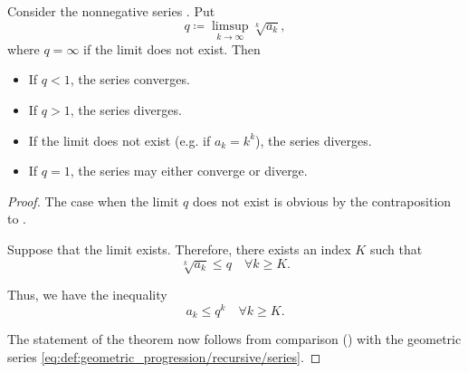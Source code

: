 \begin{proposition}\label{thm:cauchys_root_test}
  Consider the nonnegative series . Put
  \begin{equation*}
    q \coloneqq \limsup_{k \to \infty} \sqrt[k]{a_k},
  \end{equation*}
  where \( q = \infty \) if the limit does not exist. Then
  \begin{itemize}
    \item If \( q < 1 \), the series converges.
    \item If \( q > 1 \), the series diverges.
    \item If the limit does not exist (e.g. if \( a_k = k^k \)), the series diverges.
    \item If \( q = 1 \), the series may either converge or diverge.
  \end{itemize}
\end{proposition}
\begin{proof}
  The case when the limit \( q \) does not exist is obvious by the contraposition to .

  Suppose that the limit exists. Therefore, there exists an index \( K \) such that
  \begin{equation*}
    \sqrt[k]{a_k} \leq q \quad\forall k \geq K.
  \end{equation*}

  Thus, we have the inequality
  \begin{equation*}
    a_k \leq q^k \quad\forall k \geq K.
  \end{equation*}

  The statement of the theorem now follows from comparison () with the geometric series \eqref{eq:def:geometric_progression/recursive/series}.
\end{proof}

